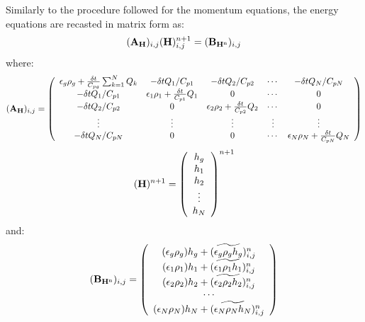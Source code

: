 Similarly to the procedure followed for the momentum equations, the energy equations
are recasted in matrix form as:
%
\begin{eqnarray}
({\bf A_H})_{i,j} ({\bf H})_{i,j}^{n+1} = ({\bf B_{H^{\rm n}}})_{i,j}
\nonumber
\end{eqnarray}
%
where:
%
\begin{eqnarray}
({\bf A_H})_{i,j} = \left ( \begin{array}{ccccc}
\epsilon_g \rho_g + \frac{\delta t}{C_{pg}} \sum_{k=1}^{N} Q_{k} & -\delta t Q_1/ C_{p1} & -\delta t Q_2/ C_{p2}  & \cdots & -\delta t Q_N/ C_{pN} \\
-\delta t Q_1/ C_{p1} & \epsilon_1 \rho_1 + \frac{\delta t}{C_{p1}} Q_{1} & 0 & \cdots & 0  \\
-\delta t Q_2/ C_{p2} & 0 & \epsilon_2 \rho_2 + \frac{\delta t}{C_{p2}} Q_{2} & \cdots & 0  \\
\vdots  & \vdots  & \vdots  & \vdots  & \vdots   \\
-\delta t Q_N/ C_{pN} &  0  &  0  &  \cdots   & \epsilon_N \rho_N + \frac{\delta t}{C_{pN}} Q_{N}
\end{array} \right )
\nonumber
\end{eqnarray}
%
\begin{eqnarray}
({\bf H})^{n+1} =  \left( \begin{array}{c}
h_g \\
h_1 \\
h_2 \\
\vdots \\
h_N \end{array} \right )^{n+1} 
\nonumber
\end{eqnarray}
%
and:
%
\begin{eqnarray}
({\bf B_{H^{\rm n}}})_{i,j}=  \left ( \begin{array}{c}
(\epsilon_g \rho_g) h_g + (\widetilde{\epsilon_g \rho_g h_g})^n_{i,j} \\
(\epsilon_1 \rho_1) h_1 + (\widetilde{\epsilon_1 \rho_1 h_1})^n_{i,j} \\
(\epsilon_2 \rho_2) h_2 + (\widetilde{\epsilon_2 \rho_2 h_2})^n_{i,j} \\
\cdots \\
(\epsilon_N \rho_N) h_N + (\widetilde{\epsilon_N \rho_N h_N})^n_{i,j} \\
\end{array} \right )
\nonumber
\end{eqnarray}
%
\newpage

